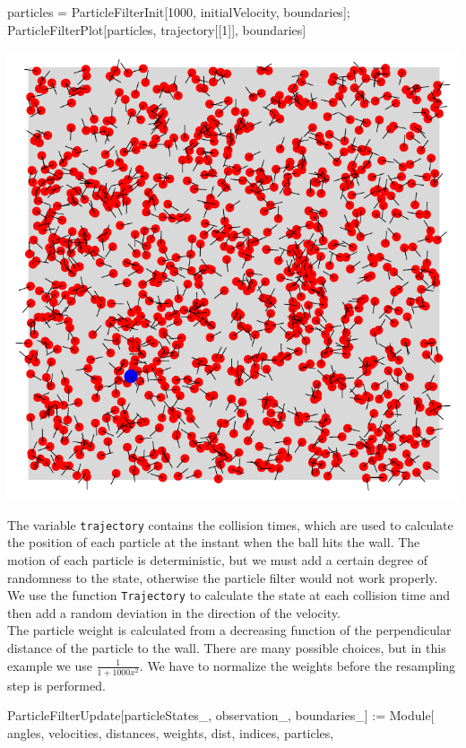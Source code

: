 \documentclass{tstextbook}
\begin{document}
\begin{example}
\begin{mathematica}
particles = ParticleFilterInit[1000, initialVelocity, boundaries];
ParticleFilterPlot[particles, trajectory[[1]], boundaries]
\end{mathematica}

\includegraphics[scale=0.5, center]{images/particles.pdf}

The variable \texttt{trajectory} contains the collision times, which are used to calculate the position of each particle at the instant when the ball hits the wall.
The motion of each particle is deterministic, but we must add a certain degree of randomness to the state, otherwise the particle filter would not work properly.
We use the function \texttt{Trajectory} to calculate the state at each collision time and then add a random deviation in the direction of the velocity. \\

The particle weight is calculated from a decreasing function of the perpendicular distance of the particle to the wall. There are many possible choices, but in this example we use $\frac{1}{1+1000x^2}$. We have to normalize the weights before the resampling step is performed. \\

\begin{mathematica}
ParticleFilterUpdate[particleStates_, observation_, boundaries_] := Module[
    {angles, velocities, distances, weights, dist, indices, particles},


\end{mathematica}
\end{example}
\end{document}
